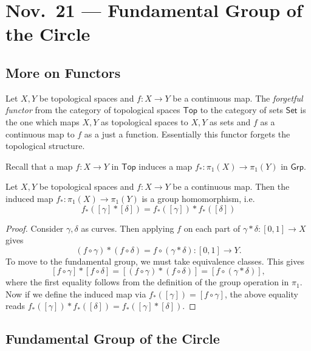 \chapter{Nov.~21 --- Fundamental Group of the Circle}

\section{More on Functors}
\begin{example}
  Let $X, Y$ be topological spaces and
  $f : X \to Y$ be a continuous map.
  The \emph{forgetful functor} from the category
  of topological spaces $\mathsf{Top}$
  to the category of sets $\mathsf{Set}$
  is the one which maps $X, Y$ as topological
  spaces to $X, Y$ as sets and $f$ as a continuous map
  to $f$ as a just a function. Essentially
  this functor forgets the topological structure.
\end{example}

\begin{remark}
  Recall that a map $f : X \to Y$ in
  $\mathsf{Top}$ induces a map
  $f_* : \pi_1(X) \to \pi_1(Y)$ in $\mathsf{Grp}$.
\end{remark}

\begin{prop}
  Let $X, Y$ be topological spaces and
  $f : X \to Y$ be a continuous map. Then
  the induced map $f_* : \pi_1(X) \to \pi_1(Y)$
  is a group homomorphism, i.e.
  \[
    f_*([\gamma] * [\delta])
    = f_*([\gamma]) * f_*([\delta])
  \]
\end{prop}

\begin{proof}
  Consider $\gamma, \delta$ as curves.
  Then applying $f$ on each part of
  $\gamma * \delta : [0, 1] \to X$ gives
  \[
    (f \circ \gamma) * (f \circ \delta)
    = f \circ (\gamma * \delta)
    : [0, 1] \to Y.
  \]
  To move to the fundamental group, we must
  take equivalence classes. This gives
  \[
    [f \circ \gamma] * [f \circ \delta]
    = [(f \circ \gamma) * (f \circ \delta)]
    = [f \circ (\gamma * \delta)],
  \]
  where the first equality follows from the
  definition of the group operation in $\pi_1$.
  Now if we define the induced
  map via $f_*([\gamma]) = [f \circ \gamma]$,
  the above equality reads
  $f_*([\gamma]) * f_*([\delta]) = f_*([\gamma] * [\delta])$.
\end{proof}

\section{Fundamental Group of the Circle}

